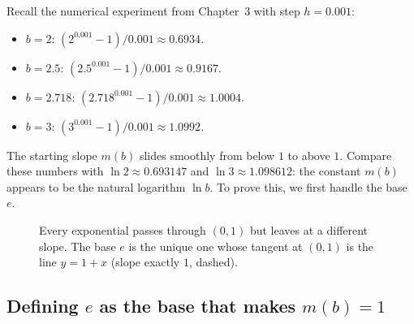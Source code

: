 \begin{labbox}
Recall the numerical experiment from Chapter~3 with step $h = 0.001$:
\begin{itemize}
\item $b = 2$: \; $(2^{0.001}-1)/0.001 \approx 0.6934$.
\item $b = 2.5$: \; $(2.5^{0.001}-1)/0.001 \approx 0.9167$.
\item $b = 2.718$:\; $(2.718^{0.001}-1)/0.001 \approx 1.0004$.
\item $b = 3$: \; $(3^{0.001}-1)/0.001 \approx 1.0992$.
\end{itemize}
The starting slope $m(b)$ slides smoothly from below $1$ to above $1$.
Compare these numbers with $\ln 2 \approx 0.693147$ and $\ln 3 \approx 1.098612$: the
constant $m(b)$ appears to be the natural logarithm $\ln b$. To prove this,
we first handle the base $e$.
\end{labbox}

\begin{figure}[H]
\centering
{}
\caption{Every exponential passes through $(0,1)$ but leaves at a different
slope. The base $e$ is the unique one whose tangent at $(0,1)$ is the line
$y = 1 + x$ (slope exactly $1$, dashed).}
\label{ch12:fig-exp-family}
\end{figure}

\subsection{Defining $e$ as the base that makes $m(b)=1$}

